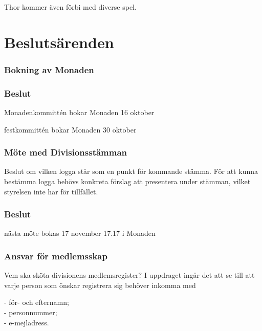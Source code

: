 \documentclass[protokoll]{dvd}
\begin{document}
Thor kommer även förbi med diverse spel.

\newpage


\section{Beslutsärenden}

\subsubsection{Bokning av Monaden}

\subsubsection*{Beslut}
\begin{attsatser}
    \item Monadenkommittén bokar Monaden 16 oktober
    \item festkommittén bokar Monaden 30 oktober
\end{attsatser}

\subsubsection{Möte med Divisionsstämman}

Beslut om vilken logga står som en punkt för kommande stämma. 
För att kunna bestämma logga behövs konkreta förslag att presentera under stämman, vilket styrelsen inte har för tillfället.

\subsubsection*{Beslut}
\begin{attsatser}
    \item nästa möte bokas 17 november 17.17 i Monaden 
\end{attsatser}

\subsubsection{Ansvar för medlemsskap}

Vem ska sköta divisionens medlemsregister? I uppdraget ingår det att se till att varje person som önskar registrera sig behöver inkomma med

- för- och efternamn; \\
- personnummer; \\
- e-mejladress. \\
\end{document}
